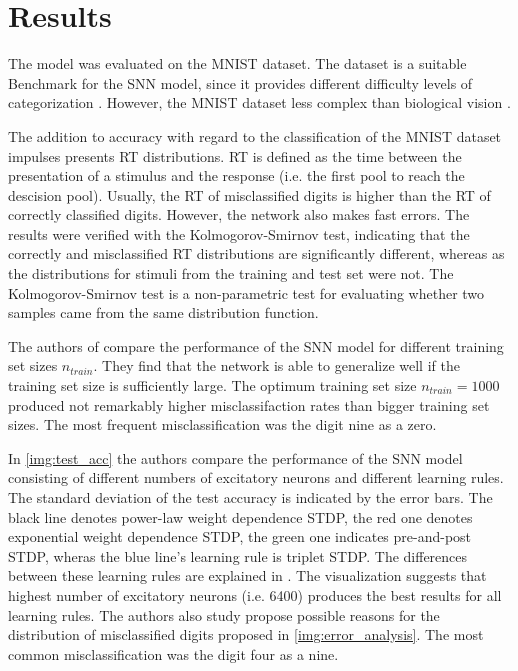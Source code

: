 \section{Results}
\label{sec:result}
The model was evaluated on the MNIST dataset.
The dataset is a suitable Benchmark for the \ac{SNN} model, 
since it provides different difficulty levels of categorization \cite{STDP_like}.
However, the MNIST dataset less complex than biological vision \cite{STDP_like}.

The addition to accuracy with regard to the classification of the MNIST dataset impulses \cite{STDP_like} presents \ac{RT} distributions.
\ac{RT} is defined as the time between the presentation of a stimulus and the response (i.e. the first pool to reach the descision pool).
Usually, the \ac{RT} of misclassified digits is higher than the \ac{RT} of correctly classified digits.
However, the network also makes fast errors.
The results were verified with the Kolmogorov-Smirnov test, 
indicating that the correctly and misclassified \ac{RT} distributions are significantly different, 
whereas as the distributions for stimuli from the training and test set were not.
The Kolmogorov-Smirnov test \cite{Kolmogorov_Smirnov} is a non-parametric test for evaluating whether two samples came from the same distribution function.

The authors of \cite{STDP_like} compare the performance of the \ac{SNN} model for different training set sizes $n_{train}$.
They find that the network is able to generalize well if the training set size is sufficiently large.
The optimum training set size $n_{train} = 1000$ produced not remarkably higher misclassifaction rates than bigger training set sizes.
The most frequent misclassification was the digit nine as a zero.


In \autoref{img:test_acc} the authors compare the performance of the \ac{SNN} model consisting of different numbers of excitatory neurons and different learning rules.
The standard deviation of the test accuracy is indicated by the error bars.
The black line denotes power-law weight dependence \ac{STDP}, the red one denotes exponential weight dependence \ac{STDP}, 
the green one indicates pre-and-post \ac{STDP}, wheras the blue line's learning rule is triplet \ac{STDP}.
The differences between these learning rules are explained in \cite{SNN}.
The visualization suggests that highest number of excitatory neurons (i.e. 6400) produces the best results for all learning rules.
The authors also study propose possible reasons for the distribution of misclassified digits proposed in \autoref{img:error_analysis}.
The most common misclassification was the digit four as a nine.

